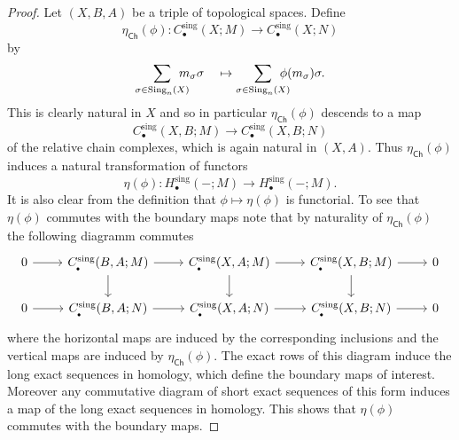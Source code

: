 \begin{proof}
    Let $(X,B,A)$ be a triple of topological spaces. Define 
    \[
    \eta_{\mathsf{Ch}}(\phi) \colon C_\bullet^\mathrm{sing}(X;M) \to C_\bullet^\mathrm{sing}(X;N)
    \]
    by 
    \[
    \sum_{\sigma \in \mathrm{Sing}_n(X)} \hspace{-1em} m_\sigma \sigma \hspace{1em} \mapsto \sum_{\sigma \in \mathrm{Sing}_n(X)} \hspace{-1em} \phi(m_\sigma) \sigma.
    \]
    This is clearly natural in $X$ and so in particular $\eta_{\mathsf{Ch}}(\phi)$ descends to a map 
    \[
    C_\bullet^\mathrm{sing}(X,B;M) \to C_\bullet^\mathrm{sing}(X,B;N)
    \]
    of the relative chain complexes, which is again natural in $(X,A)$. Thus $\eta_{\mathsf{Ch}}(\phi)$ induces a natural transformation of functors 
    \[
    \eta(\phi) \colon H_\bullet^\mathrm{sing}(-;M) \to H_\bullet^\mathrm{sing}(-;M).
    \]
    It is also clear from the definition that $\phi \mapsto \eta(\phi)$ is functorial. To see that $\eta(\phi)$ commutes with the boundary maps note that by naturality of $\eta_{\mathsf{Ch}}(\phi)$ the following diagramm commutes 
    \[\begin{tikzcd}
	0 & {C_\bullet^\mathrm{sing}(B,A;M)} & {C_\bullet^\mathrm{sing}(X,A;M)} & {C_\bullet^\mathrm{sing}(X,B;M)} & 0 \\
	0 & {C_\bullet^\mathrm{sing}(B,A;N)} & {C_\bullet^\mathrm{sing}(X,A;N)} & {C_\bullet^\mathrm{sing}(X,B;N)} & 0
	\arrow[from=1-1, to=1-2]
	\arrow[from=1-2, to=1-3]
	\arrow[from=1-2, to=2-2]
	\arrow[from=1-3, to=1-4]
	\arrow[from=1-3, to=2-3]
	\arrow[from=1-4, to=1-5]
	\arrow[from=1-4, to=2-4]
	\arrow[from=2-1, to=2-2]
	\arrow[from=2-2, to=2-3]
	\arrow[from=2-3, to=2-4]
	\arrow[from=2-4, to=2-5]
\end{tikzcd}\]
where the horizontal maps are induced by the corresponding inclusions and the vertical maps are induced by $\eta_{\mathsf{Ch}}(\phi)$. The exact rows of this diagram induce the long exact sequences in homology, which define the boundary maps of interest. Moreover any commutative diagram of short exact sequences of this form induces a map of the long exact sequences in homology. This shows that $\eta(\phi)$ commutes with the boundary maps. 


\end{proof}
